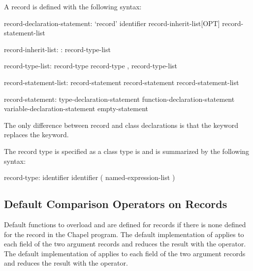 A record is defined with the following syntax:
\begin{syntax}
record-declaration-statement:
  `record' identifier record-inherit-list[OPT] {
    record-statement-list }

record-inherit-list:
  : record-type-list

record-type-list:
  record-type
  record-type , record-type-list

record-statement-list:
  record-statement
  record-statement record-statement-list

record-statement:
  type-declaration-statement
  function-declaration-statement
  variable-declaration-statement
  empty-statement
\end{syntax}
The only difference between record and class declarations is that
the  keyword replaces the  keyword.

The record type is specified as a class type is and is summarized by
the following syntax:
\begin{syntax}
record-type:
  identifier
  identifier ( named-expression-list )
\end{syntax}

\subsection{Default Comparison Operators on Records}
\label{Record_Comparison_Operators}

Default functions to overload \chpl{==} and \chpl{\!=} are defined for
records if there is none defined for the record in the Chapel program.
The default implementation of \chpl{==} applies \chpl{==} to each
field of the two argument records and reduces the result with
the \chpl{&&} operator.  The default implementation of \chpl{\!=}
applies \chpl{\!=} to each field of the two argument records and
reduces the result with the \chpl{||} operator.
